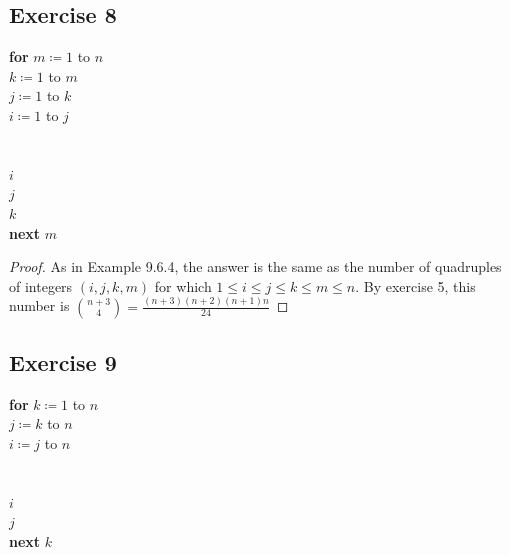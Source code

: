 \documentclass[14pt]{extarticle}
\begin{document}
\subsection{Exercise 8}
\begin{tabbing}
     {\bf for} \=\(m \coloneqq 1\) to \(n\) \\
      \=\(k \coloneqq 1\) to \(m\) \\
     \>          \=\(j\coloneqq 1\) to \(k\)\\
     \>         \>          \=\(i \coloneqq 1\) to \(j\) \\
     \>         \>         \>          \>{\it [Statements in the body of the inner loop, none} \\
     \>         \>         \>          \>{\it containing branching statements that lead outside the loop]} \\
     \>         \>          \(i\) \\
     \>          \(j\) \\
      \(k\) \\
     {\bf next} \(m\)
\end{tabbing}

\begin{proof}
     As in Example 9.6.4, the answer is the same as the number of quadruples of integers \((i, j, k, m)\) for which \(1 \leq i
     \leq j \leq k \leq m \leq n\). By exercise 5, this number is \(\binom{n+3}{4} = \frac{(n+3)(n+2)(n+1)n}{24}\)
\end{proof}

\subsection{Exercise 9}
\begin{tabbing}
     {\bf for} \=\(k \coloneqq 1\) to \(n\) \\
      \=\(j\coloneqq k\) to \(n\) \\
     \>          \=\(i \coloneqq j\) to \(n\) \\
     \>         \>          \>{\it [Statements in the body of the inner loop, none} \\
     \>         \>          \>{\it containing branching statements that lead outside the loop]} \\
     \>          \(i\) \\
      \(j\) \\
     {\bf next} \(k\)
\end{tabbing}
\end{document}
